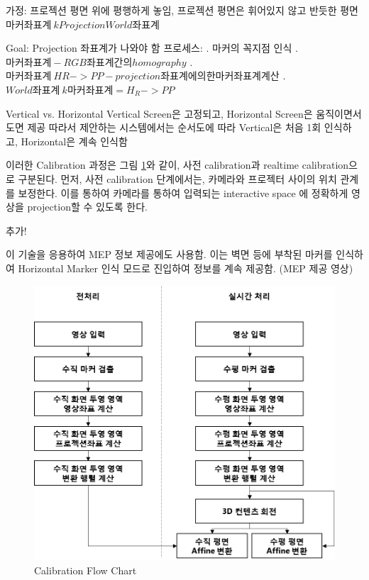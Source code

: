 가정: 프로젝션 평면 위에 평행하게 놓임, 프로젝션 평면은 휘어있지 않고 반듯한 평면
$마커 좌표계 ~ k Projection World 좌표계$

Goal: Projection 좌표계가 나와야 함
프로세스:
  . 마커의 꼭지점 인식  
  . $마커 좌표계 - RGB 좌표계 간의 homography$
  . $마커 좌표계 ~ H R -> P  P    - projection 좌표계에 의한 마커 좌표계 계산$
  . $World 좌표계 ~ k 마커 좌표계 = H_R->P P$


Vertical vs. Horizontal
Vertical Screen은 고정되고, Horizontal Screen은 움직이면서 도면 제공
따라서 제안하는 시스템에서는 순서도에 따라 Vertical은 처음 1회 인식하고, Horizontal은 계속 인식함

이러한 Calibration 과정은 그림 \ref{fig:flowchart_calibration}와 같이, 사전 calibration과 realtime calibration으로 구분된다. 먼저, 사전 calibration 단계에서는, 카메라와 프로젝터 사이의 위치 관계를 보정한다. 이를 통하여 카메라를 통하여 입력되는 interactive space 에 정확하게 영상을 projection할 수 있도록 한다. 

 추가!

이 기술을 응용하여 MEP 정보 제공에도 사용함.
이는 벽면 등에 부착된 마커를 인식하여 Horizontal Marker 인식 모드로 진입하여 정보를 계속 제공함. (MEP 제공 영상)
























\begin{figure}[ht!]
	\centering
    \includegraphics[width=1.0\textwidth]{3-System/flowchart_calibration}
	\caption{Calibration Flow Chart}
    \label{fig:flowchart_calibration}
\end{figure}


